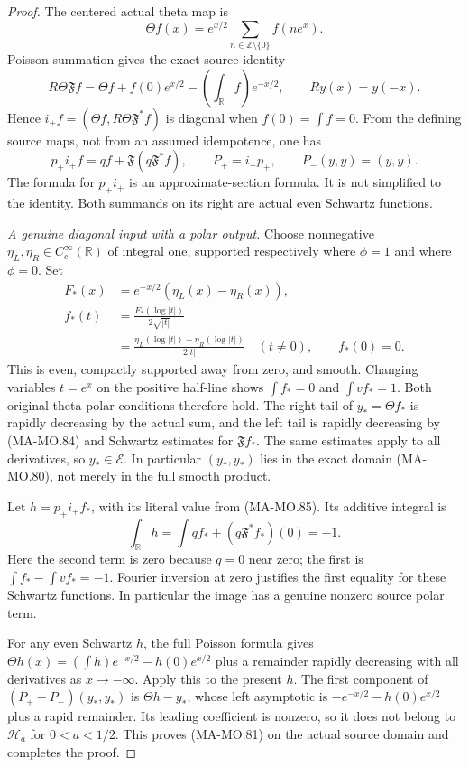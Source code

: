 \begin{proof}
The centered actual theta map is
\[
 \Theta f(x)=e^{x/2}\sum_{n\in\mathbb Z\setminus\{0\}}f(ne^x).
 \tag{MA-MO.83}
\]
Poisson summation gives the exact source identity
\[
 R\Theta\mathfrak F f
      =\Theta f+f(0)e^{x/2}
                     -\left(\int_{\mathbb R}f\right)e^{-x/2},
                          \qquad Ry(x)=y(-x).
 \tag{MA-MO.84}
\]
Hence \(i_+f=(\Theta f,R\Theta\mathfrak F^*f)\) is diagonal
when \(f(0)=\int f=0\). From the defining source maps,
not from an assumed idempotence, one has
\[
 p_+i_+f=qf+\mathfrak F(q\mathfrak F^*f),
                \qquad P_+=i_+p_+,\qquad
 P_-(y,y)=(y,y).
 \tag{MA-MO.85}
\]
The formula for \(p_+i_+\) is an approximate-section formula.
It is not simplified to the identity. Both summands on its
right are actual even Schwartz functions.

\emph{A genuine diagonal input with a polar output.}
Choose nonnegative \(\eta_L,\eta_R\in C_c^\infty(\mathbb R)\)
of integral one, supported respectively where \(\phi=1\)
and where \(\phi=0\). Set
\[
 \begin{aligned}
 F_*(x)&=e^{-x/2}(\eta_L(x)-\eta_R(x)),\\
 f_*(t)&=\frac{F_*(\log|t|)}{2\sqrt{|t|}}\\
       &=\frac{\eta_L(\log|t|)-\eta_R(\log|t|)}{2|t|}
                                     \quad(t\ne0),\qquad f_*(0)=0.
 \end{aligned}
 \tag{MA-MO.86}
\]
This is even, compactly supported away from zero, and smooth.
Changing variables \(t=e^x\) on the positive half-line shows
\(\int f_*=0\) and \(\int vf_*=1\). Both original theta
polar conditions therefore hold. The right tail of
\(y_*=\Theta f_*\) is rapidly decreasing by the actual sum,
and the left tail is rapidly decreasing by (MA-MO.84) and
Schwartz estimates for \(\mathfrak F f_*\). The same
estimates apply to all derivatives, so \(y_*\in\mathcal E\).
In particular \((y_*,y_*)\) lies in the exact domain
(MA-MO.80), not merely in the full smooth product.

Let \(h=p_+i_+f_*\), with its literal value from (MA-MO.85).
Its additive integral is
\[
 \int_{\mathbb R}h
   =\int qf_*+(q\mathfrak F^*f_*)(0)
   =-1.
 \tag{MA-MO.87}
\]
Here the second term is zero because \(q=0\) near zero;
the first is \(\int f_*-\int vf_*=-1\). Fourier inversion
at zero justifies the first equality for these Schwartz
functions. In particular the image has a genuine nonzero
source polar term.

For any even Schwartz \(h\), the full Poisson formula gives
\(\Theta h(x)=(\int h)e^{-x/2}-h(0)e^{x/2}\) plus a
remainder rapidly decreasing with all derivatives as
\(x\to-\infty\). Apply this to the present \(h\). The
first component of \((P_+-P_-)(y_*,y_*)\) is
\(\Theta h-y_*\), whose left asymptotic is
\(-e^{-x/2}-h(0)e^{x/2}\) plus a rapid remainder. Its
leading coefficient is nonzero, so it does not belong to
\(\mathcal H_a\) for \(0<a<1/2\). This proves (MA-MO.81)
on the actual source domain and completes the proof.
\end{proof}

